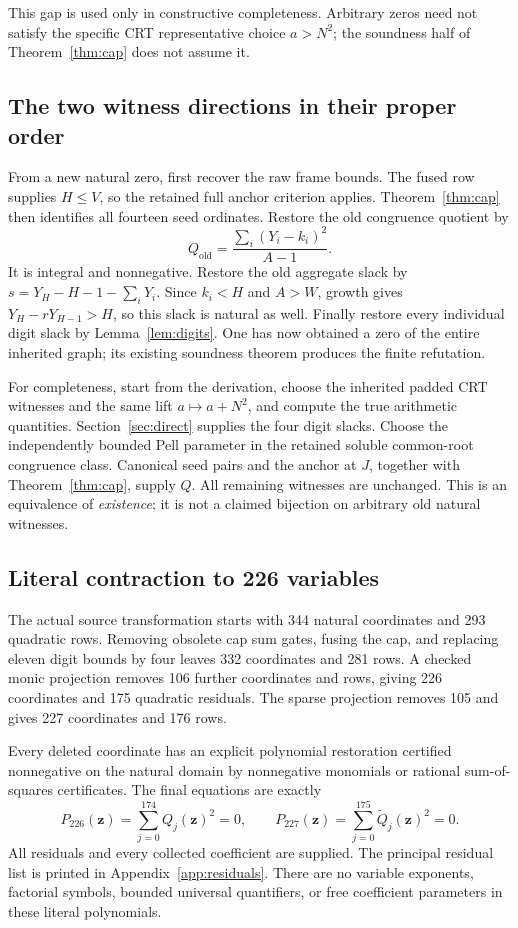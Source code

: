 \documentclass[11pt,letterpaper]{article}
\theoremstyle{definition}\newtheorem{definition}[theorem]{Definition}
\theoremstyle{remark}\newtheorem{remark}[theorem]{Remark}
\begin{document}
This gap is used only in constructive completeness. Arbitrary zeros need
not satisfy the specific CRT representative choice \(a>N^2\); the
soundness half of Theorem~\ref{thm:cap} does not assume it.

\subsection{The two witness directions in their proper order}

From a new natural zero, first recover the raw frame bounds. The fused
row supplies \(H\le V\), so the retained full anchor criterion applies.
Theorem~\ref{thm:cap} then identifies all fourteen seed ordinates.
Restore the old congruence quotient by
\[
 Q_{\mathrm{old}}=\frac{\sum_i(Y_i-k_i)^2}{A-1}.
\]
It is integral and nonnegative. Restore the old aggregate slack by
\(s=Y_H-H-1-\sum_iY_i\). Since \(k_i<H\) and \(A>W\), growth gives
\(Y_H-rY_{H-1}>H\), so this slack is natural as well. Finally restore
every individual digit slack by Lemma~\ref{lem:digits}. One has now
obtained a zero of the entire inherited graph; its existing soundness
theorem produces the finite refutation.

For completeness, start from the derivation, choose the inherited padded
CRT witnesses and the same lift \(a\mapsto a+N^2\), and compute the
true arithmetic quantities. Section~\ref{sec:direct} supplies the four
digit slacks. Choose the independently bounded Pell parameter in the
retained soluble common-root congruence class. Canonical seed pairs and
the anchor at \(J\), together with Theorem~\ref{thm:cap}, supply \(Q\).
All remaining witnesses are unchanged. This is an equivalence of
\emph{existence}; it is not a claimed bijection on arbitrary old natural
witnesses.

\subsection{Literal contraction to 226 variables}

The actual source transformation starts with 344 natural coordinates and
293 quadratic rows. Removing obsolete cap sum gates, fusing the cap, and
replacing eleven digit bounds by four leaves 332 coordinates and 281 rows.
A checked monic projection removes 106 further coordinates and rows,
giving 226 coordinates and 175 quadratic residuals. The sparse projection
removes 105 and gives 227 coordinates and 176 rows.

Every deleted coordinate has an explicit polynomial restoration certified
nonnegative on the natural domain by nonnegative monomials or rational
sum-of-squares certificates. The final equations are exactly
\[
 P_{226}(\mathbf z)=\sum_{j=0}^{174}Q_j(\mathbf z)^2=0,
 \qquad
 P_{227}(\mathbf z)=\sum_{j=0}^{175}\widetilde Q_j(\mathbf z)^2=0.
\]
All residuals and every collected coefficient are supplied. The principal
residual list is printed in Appendix~\ref{app:residuals}. There are no
variable exponents, factorial symbols, bounded universal quantifiers, or
free coefficient parameters in these literal polynomials.
\end{document}
